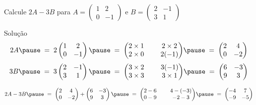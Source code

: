 \begin{question}
Calcule
\(
  2A-3B
\)
para
\(
  A=
  \begin{pmatrix}
    1 & 2  \\
    0 & -1
  \end{pmatrix}
\)
e
\(
  B=
  \begin{pmatrix}
    2 & -1 \\
    3 & 1
  \end{pmatrix}
\)
\end{question}

\begin{resolution}{Solução}
\[
  2A
  \pause
  \;=\;
  2 \begin{pmatrix}
    1 & 2  \\
    0 & -1
  \end{pmatrix}
  \pause
  \;=\;
  {\setlength{\arraycolsep}{12pt}
  \begin{pmatrix}
    2 \times 1 & 2 \times 2  \\
    2 \times 0 & 2(-1)
  \end{pmatrix}}
  \pause
  \;=\;
  \begin{pmatrix}
    2 & 4\\
    0 & -2
  \end{pmatrix}
\]
\pause
\[
  3B
  \pause\;=\;
  3 \begin{pmatrix}
    2 & -1 \\
    3 & 1
  \end{pmatrix}
  \pause
  \;=\;
  {\setlength{\arraycolsep}{12pt}
  \begin{pmatrix}
    3 \times 2 & 3(-1) \\
    3 \times 3 & 3 \times 1
  \end{pmatrix}}
  \pause
  \;=\;
  \begin{pmatrix}
    6 & -3 \\
    9 & 3
  \end{pmatrix}
\]

\pause
\smallskip
\[
  2A-3B
  \pause\;=\;
  \begin{pmatrix}
    2 & 4\\
    0 & -2
  \end{pmatrix}
  +
  \begin{pmatrix}
    6 & -3 \\
    9 & 3
  \end{pmatrix}
  \pause
  \;=\;
  {\setlength{\arraycolsep}{12pt}
  \begin{pmatrix}
    2 - 6 & 4 - (-3)\\
    0 - 9 & -2 - 3
  \end{pmatrix}}
  \pause
  \;=\;
  \begin{pmatrix}
    -4 & 7  \\
    -9 & -5
  \end{pmatrix}
\]
\end{resolution}

